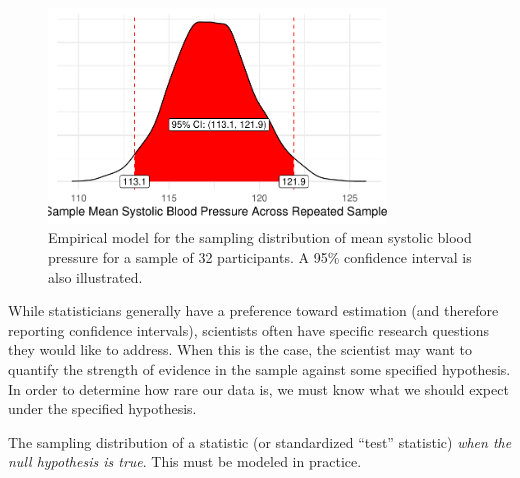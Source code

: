 \documentclass[
  letterpaper,
  DIV=11,
  numbers=noendperiod]{scrreprt}
\theoremstyle{definition}
\theoremstyle{definition}
\theoremstyle{remark}
\begin{document}
\begin{figure}

{\centering \includegraphics[width=0.8\textwidth,height=\textheight]{./images/fig-distributional-quartet-sampling-distribution-1.pdf}

}

\caption{\label{fig-distributional-quartet-sampling-distribution}Empirical
model for the sampling distribution of mean systolic blood pressure for
a sample of 32 participants. A 95\% confidence interval is also
illustrated.}

\end{figure}

While statisticians generally have a preference toward estimation (and
therefore reporting confidence intervals), scientists often have
specific research questions they would like to address. When this is the
case, the scientist may want to quantify the strength of evidence in the
sample against some specified hypothesis. In order to determine how rare
our data is, we must know what we should expect under the specified
hypothesis.

\begin{tcolorbox}[enhanced jigsaw, left=2mm, toprule=.15mm, arc=.35mm, breakable, opacitybacktitle=0.6, opacityback=0, rightrule=.15mm, colbacktitle=quarto-callout-important-color!10!white, coltitle=black, leftrule=.75mm, toptitle=1mm, colframe=quarto-callout-important-color-frame, titlerule=0mm, title=\textcolor{quarto-callout-important-color}{\faExclamation}\hspace{0.5em}{Null Distribution}, bottomrule=.15mm, colback=white, bottomtitle=1mm]

The sampling distribution of a statistic (or standardized ``test''
statistic) \emph{when the null hypothesis is true}. This must be modeled
in practice.

\end{tcolorbox}
\end{document}
